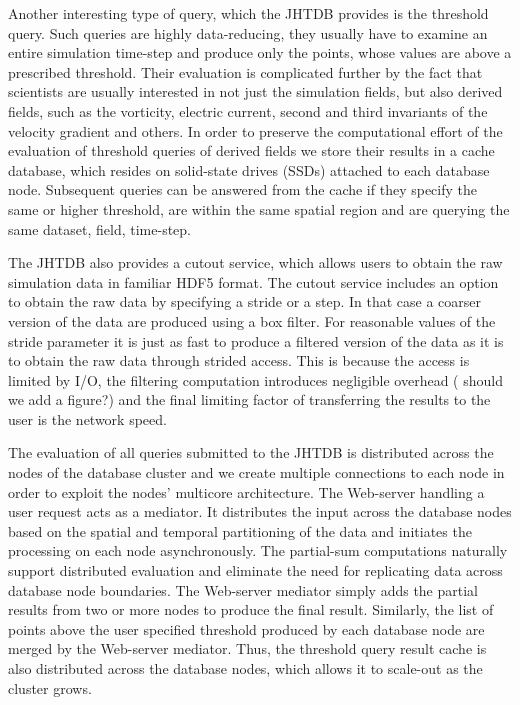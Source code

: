 \documentclass[10pt,twocolumn]{article}
\begin{document}
Another interesting type of query, which the JHTDB provides is the threshold query. Such queries are highly data-reducing, they usually have to examine an
entire simulation time-step and produce only the points, whose values are above a prescribed threshold. Their evaluation is complicated further by the fact
that scientists are usually interested in not just the simulation fields, but also derived fields, such as the vorticity, electric current, second and third invariants
of the velocity gradient and others. In order to preserve the computational effort of the evaluation of threshold queries of derived fields we store their results
in a cache database, which resides on solid-state drives (SSDs) attached to each database node. Subsequent queries can be answered from the cache
if they specify the same or higher threshold, are within the same spatial region and are querying the same dataset, field, time-step.

The JHTDB also provides a cutout service, which allows users to obtain the raw simulation data in familiar HDF5 format. The cutout service includes an
option to obtain the raw data by specifying a stride or a step. In that case a coarser version of the data are produced using a box filter. For reasonable
values of the stride parameter it is just as fast to produce a filtered version of the data as it is to obtain the raw data through strided access.  This is because
the access is limited by I/O, the filtering computation introduces negligible overhead ({\color{red} should we add a figure?}) and the final limiting factor of
transferring the results to the user is the network speed.

The evaluation of all queries submitted to the JHTDB is distributed across the nodes of the database cluster and we create multiple connections to each
node in order to exploit the nodes' multicore architecture. The Web-server handling a user request acts as a mediator. It distributes the input across the
database nodes based on the spatial and temporal partitioning of the data and initiates the processing on each node asynchronously. The partial-sum
computations naturally support distributed evaluation and eliminate the need
for replicating data across database node boundaries. The Web-server mediator simply adds the partial results from two or more nodes to produce the
final result. Similarly, the list of points above the user specified threshold produced by each database node are merged by the Web-server mediator. 
Thus, the threshold query result cache is also distributed across the database nodes, which allows it to scale-out as the cluster grows.
\end{document}
